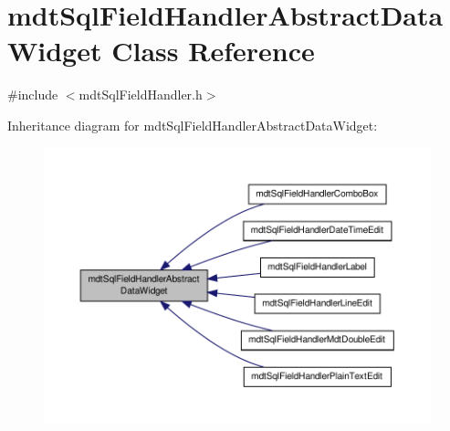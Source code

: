 \hypertarget{classmdt_sql_field_handler_abstract_data_widget}{\section{mdt\-Sql\-Field\-Handler\-Abstract\-Data\-Widget Class Reference}
\label{classmdt_sql_field_handler_abstract_data_widget}
}


{\ttfamily \#include $<$mdt\-Sql\-Field\-Handler.\-h$>$}



Inheritance diagram for mdt\-Sql\-Field\-Handler\-Abstract\-Data\-Widget\-:\nopagebreak
\begin{figure}[H]
\begin{center}
\leavevmode
\includegraphics[width=350pt]{classmdt_sql_field_handler_abstract_data_widget__inherit__graph}
\end{center}
\end{figure}
